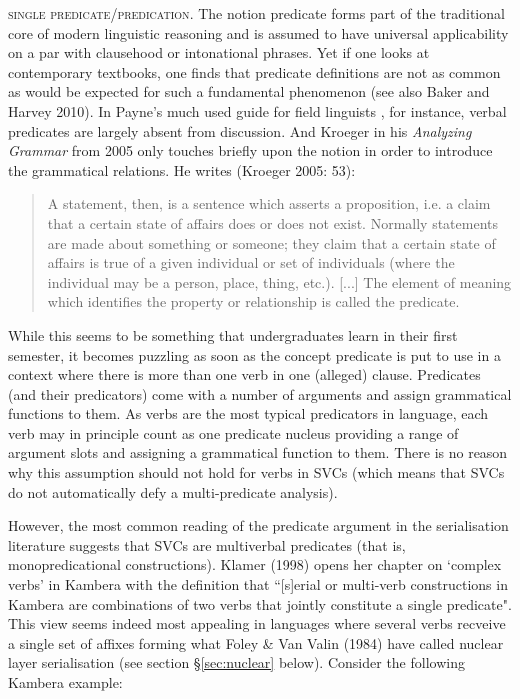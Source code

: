 \textsc{single predicate/predication}. The notion predicate forms part of the traditional core of modern linguistic reasoning and is assumed to have universal applicability on a par with clausehood or intonational phrases. Yet if one looks at contemporary textbooks, one finds that predicate definitions are not as common as would be expected for such a fundamental phenomenon (see also Baker and Harvey 2010). In Payne's  much used guide for field linguists \parencite{payne1997describing}, for instance, verbal predicates are largely absent from discussion. And Kroeger in his \textit{Analyzing Grammar} from 2005 only touches briefly upon the notion in order to introduce the grammatical relations. He writes (Kroeger 2005: 53):
\begin{quote}A statement, then, is a sentence which asserts a proposition, i.e. a claim
that a certain state of affairs does or does not exist. Normally statements are
made about something or someone; they claim that a certain state of affairs
is true of a given individual or set of individuals (where the individual may
be a person, place, thing, etc.). [...] The element of meaning which identifies the property or relationship is
called the predicate.\end{quote}
While this seems to be something that undergraduates learn in their first semester, it becomes puzzling as soon as the concept predicate is put to use in a context where there is more than one verb in one (alleged) clause. Predicates (and their predicators) come with a number of arguments and assign grammatical functions to them. As verbs are the most typical predicators in language, each verb may in principle count as one predicate nucleus providing a range of argument slots and assigning a grammatical function to them. There is no reason why this assumption should not hold for verbs in SVCs (which means that SVCs do not automatically defy a multi-predicate analysis).

However, the most common reading of the predicate argument in the serialisation literature suggests that SVCs are multiverbal predicates (that is, monopredicational constructions). Klamer (1998) opens her chapter on `complex verbs' in Kambera with the definition that ``[s]erial or multi-verb constructions in Kambera are combinations of two verbs that jointly constitute a single predicate". This view seems indeed most appealing in languages where several verbs recveive a single set of affixes forming what Foley \& Van Valin (1984) have called nuclear layer serialisation (see section §\ref{sec:nuclear} below). Consider the following Kambera example:

